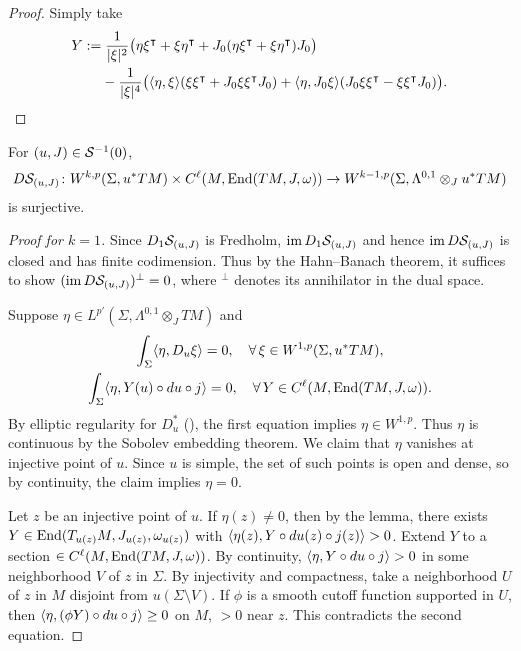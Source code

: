 \begin{proof}
	Simply take 
	\begin{align*}
		Y & := \frac {1} {|\xi|^2} \big( \eta \xi^\intercal + \xi \eta^\intercal 
			+ J_0 ( \eta \xi^\intercal + \xi \eta^\intercal ) J_0 \big) \\
		& \ph - \frac {1} {|\xi|^4} \big( \la \eta, \xi \ra (\xi \xi^\intercal 
			+ J_0 \xi \xi^\intercal J_0 ) + \la \eta, J_0 \xi \ra 
			( J_0 \xi \xi^\intercal - \xi \xi^\intercal J_0 ) \big).
		\qedhere
	\end{align*}
\end{proof}

\begin{proposition}
	For $(u, J) \in {\mathcal{S}}^{-1} (0)$, 
	\[
		D{\mathcal{S}}_{(u, J)} \colon W^{k, p} (\Sigma, u^*TM) 
			\times C^\ell (M, \operatorname{End}(TM, J, \omega)) \to 
			W^{k - 1, p} (\Sigma, \Lambda^{0, 1}\otimes_J u^*TM)
	\] 
	is surjective.
\end{proposition}
\begin{proof}[Proof for $k=1$]
	Since $D_1{\mathcal{S}}_{(u, J)}$ is Fredholm, $\operatorname{im} D_1{\mathcal{S}}_{(u, J)}$ and hence 
	$\operatorname{im} D{\mathcal{S}}_{(u, J)}$ is closed and has finite codimension. 
	Thus by the Hahn--Banach theorem, it suffices to show 
	$(\operatorname{im} D{\mathcal{S}}_{(u, J)})^\perp = 0$, where $^\perp$ denotes its 
	annihilator in the dual space.

	Suppose $\eta \in L^{p'} (\Sigma, \Lambda^{0, 1} \otimes_J TM)$ and 
	\begin{gather*}
		\int_\Sigma \langle \eta, D_u\xi \rangle = 0, \quad
			\forall\, \xi \in W^{1, p} (\Sigma, u^*TM), \\
		\int_\Sigma \langle \eta, Y(u) \circ du \circ j \rangle = 0, \quad
			\forall\, Y \in C^\ell (M, \operatorname{End}(TM, J, \omega)).
	\end{gather*} 
	By elliptic regularity for $D_u^*$ 
	(\cite[Proposition~3.1.11 and Theorem~C.2.3]{MS}), 
	the first equation implies $\eta\in W^{1, p}$. 
	Thus $\eta$ is continuous by the Sobolev embedding theorem. 
	We claim that $\eta$ vanishes at injective point of $u$. 
	Since $u$ is simple, the set of such points is open and dense, so by continuity, the claim implies $\eta = 0$.

	Let $z$ be an injective point of $u$. 
	If $\eta(z) \neq 0$, then by the lemma, there exists 
	$Y \in \operatorname{End}(T_{u(z)} M, J_{u(z)}, \omega_{u(z)})$ with 
	$\langle \eta(z), Y \circ du(z) \circ j(z) \rangle > 0$. 
	Extend $Y$ to a section $\in C^\ell (M, \operatorname{End}(TM, J, \omega))$. 
	By continuity, $\langle \eta, Y \circ du \circ j \rangle > 0$ 
	in some neighborhood $V$ of $z$ in $\Sigma$. 
	By injectivity and compactness, take a neighborhood $U$ of $z$ 
	in $M$ disjoint from $u ( \Sigma \setminus V )$. 
	If $\phi$ is a smooth cutoff function supported in $U$, then 
	$\langle \eta, (\phi Y) \circ du \circ j \rangle \geq 0$ on $M$, $>0$ near $z$. 
	This contradicts the second equation.
\end{proof}

